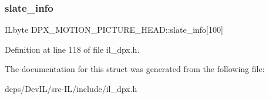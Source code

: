 \subsubsection{\texorpdfstring{slate\+\_\+info}{slate\_info}}
{\footnotesize\ttfamily I\+Lbyte D\+P\+X\+\_\+\+M\+O\+T\+I\+O\+N\+\_\+\+P\+I\+C\+T\+U\+R\+E\+\_\+\+H\+E\+A\+D\+::slate\+\_\+info\mbox{[}100\mbox{]}}



Definition at line 118 of file il\+\_\+dpx.\+h.



The documentation for this struct was generated from the following file\+:\begin{DoxyCompactItemize}
\item 
deps/\+Dev\+I\+L/src-\/\+I\+L/include/il\+\_\+dpx.\+h\end{DoxyCompactItemize}
